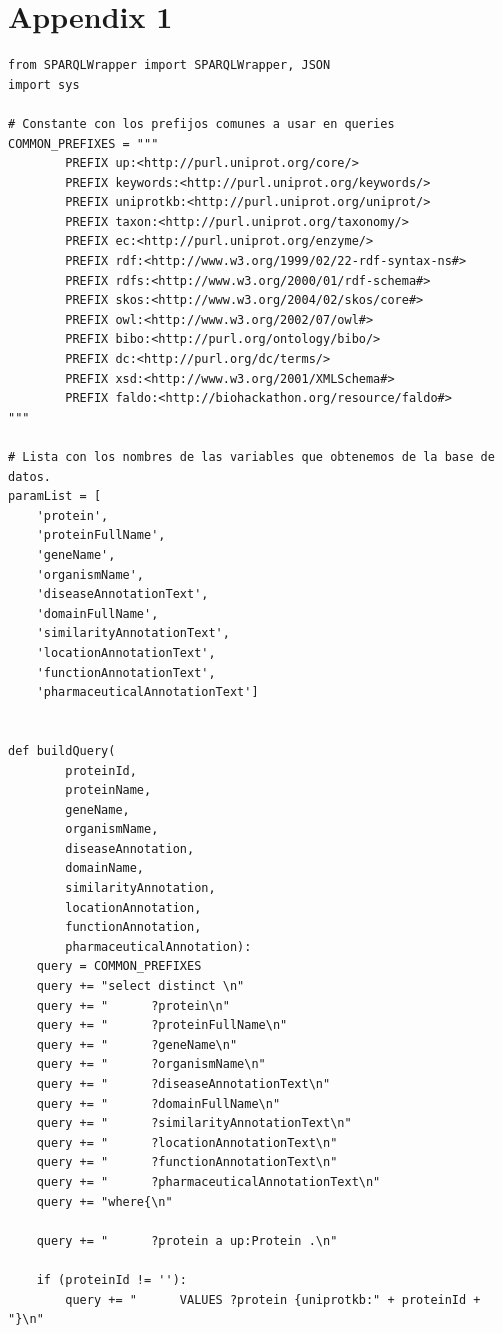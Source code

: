 \documentclass[12pt]{article}
\begin{document}
\section*{Appendix 1}
\begin{Verbatim}
from SPARQLWrapper import SPARQLWrapper, JSON
import sys

# Constante con los prefijos comunes a usar en queries
COMMON_PREFIXES = """
        PREFIX up:<http://purl.uniprot.org/core/>
        PREFIX keywords:<http://purl.uniprot.org/keywords/>
        PREFIX uniprotkb:<http://purl.uniprot.org/uniprot/>
        PREFIX taxon:<http://purl.uniprot.org/taxonomy/>
        PREFIX ec:<http://purl.uniprot.org/enzyme/>
        PREFIX rdf:<http://www.w3.org/1999/02/22-rdf-syntax-ns#>
        PREFIX rdfs:<http://www.w3.org/2000/01/rdf-schema#>
        PREFIX skos:<http://www.w3.org/2004/02/skos/core#>
        PREFIX owl:<http://www.w3.org/2002/07/owl#>
        PREFIX bibo:<http://purl.org/ontology/bibo/>
        PREFIX dc:<http://purl.org/dc/terms/>
        PREFIX xsd:<http://www.w3.org/2001/XMLSchema#>
        PREFIX faldo:<http://biohackathon.org/resource/faldo#>
"""

# Lista con los nombres de las variables que obtenemos de la base de datos.
paramList = [
    'protein',
    'proteinFullName',
    'geneName',
    'organismName',
    'diseaseAnnotationText',
    'domainFullName',
    'similarityAnnotationText',
    'locationAnnotationText',
    'functionAnnotationText',
    'pharmaceuticalAnnotationText']


def buildQuery(
        proteinId,
        proteinName,
        geneName,
        organismName,
        diseaseAnnotation,
        domainName,
        similarityAnnotation,
        locationAnnotation,
        functionAnnotation,
        pharmaceuticalAnnotation):
    query = COMMON_PREFIXES
    query += "select distinct \n"
    query += "      ?protein\n"
    query += "      ?proteinFullName\n"
    query += "      ?geneName\n"
    query += "      ?organismName\n"
    query += "      ?diseaseAnnotationText\n"
    query += "      ?domainFullName\n"
    query += "      ?similarityAnnotationText\n"
    query += "      ?locationAnnotationText\n"
    query += "      ?functionAnnotationText\n"
    query += "      ?pharmaceuticalAnnotationText\n"
    query += "where{\n"

    query += "      ?protein a up:Protein .\n"

    if (proteinId != ''):
        query += "      VALUES ?protein {uniprotkb:" + proteinId + "}\n"


\end{Verbatim}
\end{document}
